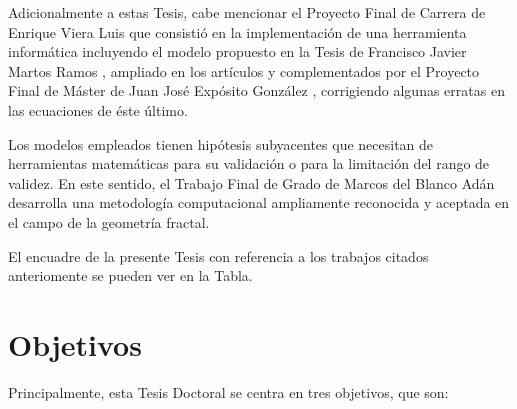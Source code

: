 \par Adicionalmente a estas Tesis, cabe mencionar el Proyecto Final de Carrera de Enrique Viera Luis \cite{vieraPFC:2014} que consistió en la implementación de una herramienta informática incluyendo el modelo propuesto en la Tesis de Francisco Javier Martos Ramos \cite{martosphD:2006}, ampliado en los artículos \cite{lapuertaetal:2010} y complementados por el Proyecto Final de Máster de Juan José Expósito González \cite{expositoPFM:2012}, corrigiendo algunas erratas en las ecuaciones de éste último. 

\par Los modelos empleados tienen hipótesis subyacentes que necesitan de herramientas matemáticas para su validación o para la limitación del rango de validez. En este sentido, el Trabajo Final de Grado de Marcos del Blanco Adán \cite{delblancoPFC:2015} desarrolla una metodología computacional ampliamente reconocida y aceptada en el campo de la geometría fractal.
\par El encuadre de la presente Tesis con referencia a los trabajos citados anteriomente se pueden ver en la Tabla.


\section{Objetivos}\label{sec:Objetivos}

\par Principalmente, esta Tesis Doctoral se centra en tres objetivos, que son:


